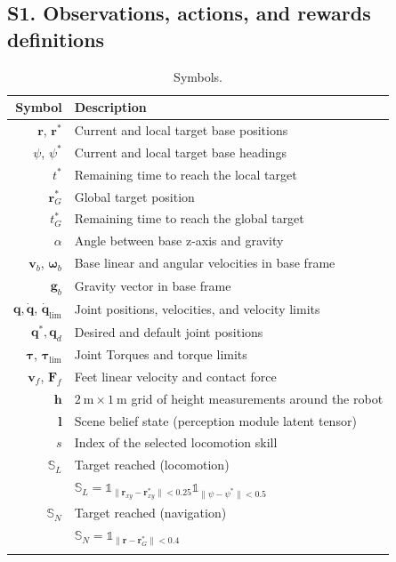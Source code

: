 \documentclass[conference]{IEEEtran}
\begin{document}
\subsection*{S1. Observations, actions, and rewards definitions}\label{app:obs_and_rews}
\begin{table}[H]
\centering
\caption{Symbols.}
\label{tab:symbols}
\begin{tabular}{rl}
\hline
\textbf{Symbol}      & \textbf{Description}       \\ \hline
$\mathbf{r}$, $\mathbf{r}^*$ & Current and local target base positions \\
$\psi$, $\psi^*$ & Current and local target base headings \\
$t^*$  & Remaining time to reach the local target \\
$\mathbf{r}_G^*$ & Global target position \\
$t_G^*$  & Remaining time to reach the global target \\
$\alpha$ & Angle between base z-axis and gravity \\
$\mathbf{v}_b$, $\boldsymbol{\omega}_b$ & Base linear and angular velocities in base frame \\
$\mathbf{g}_b$ & Gravity vector in base frame \\
$\mathbf{q}, \dot{\mathbf{q}}$, $\dot{\mathbf{q}}_{\lim}$ & Joint positions, velocities, and velocity limits \\
$\mathbf{q}^*, \mathbf{q}_d$ & Desired and default joint positions\\
$\boldsymbol{\tau}$, $\boldsymbol{\tau}_{\lim}$ & Joint Torques and torque limits \\
$\mathbf{v}_f$, $\mathbf{F}_f$ & Feet linear velocity and contact force \\
$\mathbf{h}$ & $\SI{2}{\meter}\times\SI{1}{\meter}$ grid of height measurements around the robot \\
$\mathbf{l}$ & Scene belief state (perception module latent tensor) \\
$s$ & Index of the selected locomotion skill \\
$\mathds{S}_L$ & Target reached (locomotion)\\
{} & $ \mathds{S}_L=\mathds{1}_{\lVert \mathbf{r}_{xy} - \mathbf{r}^*_{xy}\rVert < 0.25} \mathds{1}_{\lVert \psi - \psi^* \rVert < 0.5}$\\
$\mathds{S}_N$ & Target reached (navigation)\\ 
{} & $\mathds{S}_N=\mathds{1}_{\lVert \mathbf{r} - \mathbf{r}_G^*\rVert < 0.4}$\\
\hline\\
\end{tabular}
\end{table}
\end{document}
